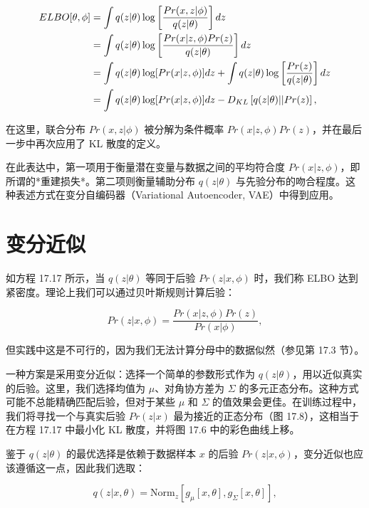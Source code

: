 \documentclass[lang=cn,newtx,10pt,scheme=chinese]{elegantbook}
\begin{document}
\begin{align}
ELBO[\theta, \phi] &= \int q(z|\theta) \log \left[ \frac{Pr(x, z|\phi)}{q(z|\theta)} \right] dz \notag \\
&= \int q(z|\theta) \log \left[ \frac{Pr(x|z, \phi)Pr(z)}{q(z|\theta)} \right] dz \notag \\
&= \int q(z|\theta) \log [Pr(x|z, \phi)] dz + \int q(z|\theta) \log \left[ \frac{Pr(z)}{q(z|\theta)} \right] dz \notag \\
&= \int q(z|\theta) \log [Pr(x|z, \phi)] dz - D_{KL} \left[ q(z|\theta) || Pr(z) \right], 
\end{align} 


在这里，联合分布 \(Pr(x, z|\phi)\) 被分解为条件概率 \(Pr(x|z, \phi)Pr(z)\)，并在最后一步中再次应用了 KL 散度的定义。

在此表达中，第一项用于衡量潜在变量与数据之间的平均符合度 \(Pr(x|z, \phi)\)，即所谓的*重建损失*。第二项则衡量辅助分布 \(q(z|\theta)\) 与先验分布的吻合程度。这种表述方式在变分自编码器（Variational Autoencoder, VAE）中得到应用。


\section{变分近似}
如方程 17.17 所示，当 \(q(z|\theta)\) 等同于后验 \(Pr(z|x, \phi)\) 时，我们称 ELBO 达到紧密度。理论上我们可以通过贝叶斯规则计算后验：

\begin{equation}
Pr(z|x, \phi) = \frac{Pr(x|z, \phi)Pr(z)}{Pr(x|\phi)}, 
\end{equation}

但实践中这是不可行的，因为我们无法计算分母中的数据似然（参见第 17.3 节）。

一种方案是采用变分近似：选择一个简单的参数形式作为 \(q(z|\theta)\)，用以近似真实的后验。这里，我们选择均值为 \(\mu\)、对角协方差为 \(\Sigma\) 的多元正态分布。这种方式可能不总能精确匹配后验，但对于某些 \(\mu\) 和 \(\Sigma\) 的值效果会更佳。在训练过程中，我们将寻找一个与真实后验 \(Pr(z|x)\) 最为接近的正态分布（图 17.8），这相当于在方程 17.17 中最小化 KL 散度，并将图 17.6 中的彩色曲线上移。

鉴于 \(q(z|\theta)\) 的最优选择是依赖于数据样本 \(x\) 的后验 \(Pr(z|x, \phi)\)，变分近似也应该遵循这一点，因此我们选取：

\begin{equation}
q(z|x, \theta) = \text{Norm}_z \left[ g_\mu[x, \theta], g_\Sigma[x, \theta] \right], 
\end{equation}
\end{document}
